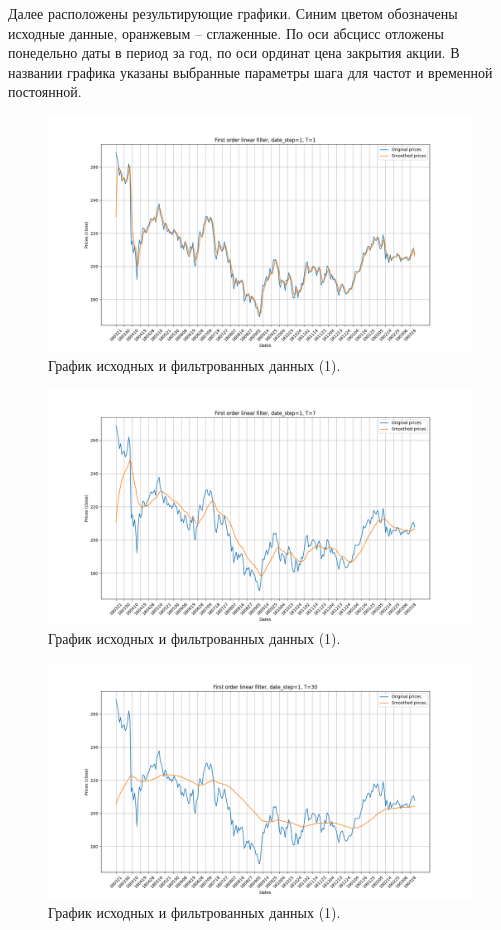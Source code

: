 \documentclass[a4paper, 12pt]{article}
\begin{document}
    Далее расположены результирующие графики. Синим цветом обозначены исходные данные, оранжевым -- сглаженные.
    По оси абсцисс отложены понедельно даты в период за год, по оси ординат цена закрытия акции. В названии графика
    указаны выбранные параметры шага для частот и временной постоянной.
    \begin{figure}[H]
        \centering
        \includegraphics[scale=0.35]{1_1.png}
        \captionsetup{skip=0pt}
        \caption{График исходных и фильтрованных данных (1).}
        \label{fig:11}
    \end{figure}
    \begin{figure}[H]
        \centering
        \includegraphics[scale=0.35]{1_7.png}
        \captionsetup{skip=0pt}
        \caption{График исходных и фильтрованных данных (1).}
        \label{fig:17}
    \end{figure}
    \begin{figure}[H]
        \centering
        \includegraphics[scale=0.35]{1_30.png}
        \captionsetup{skip=0pt}
        \caption{График исходных и фильтрованных данных (1).}
        \label{fig:30}
    \end{figure}
\end{document}

